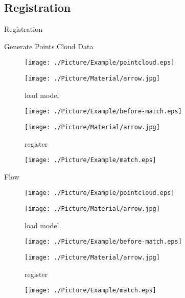\documentclass[xcolor=table,compress,blue]{beamer}
\begin{document}
\subsection{Registration}
\begin{frame}{Registration}
	\begin{exampleblock}{Generate Points Cloud Data}
		\begin{figure}[htpb]
			\centering
			\begin{minipage}[b]{0.8in}
				\centerline{ \texttt{[image: ./Picture/Example/pointcloud.eps]} }
			\end{minipage}
			\begin{minipage}[b]{0.8in}
				\centerline{ \quad}
				\centerline{ \texttt{[image: ./Picture/Material/arrow.jpg]} }
				\centerline{\tiny{load model}}
			\end{minipage}
			\begin{minipage}[b]{0.8in}
				\centerline{ \texttt{[image: ./Picture/Example/before-match.eps]} }
			\end{minipage}
			\begin{minipage}[b]{0.8in}
				\centerline{ \texttt{[image: ./Picture/Material/arrow.jpg]} }
				\centerline{\tiny{register}}
			\end{minipage}
			\begin{minipage}[b]{0.8in}
				\centerline{ \texttt{[image: ./Picture/Example/match.eps]} }
			\end{minipage}
		\end{figure}
	\end{exampleblock}
	\begin{exampleblock}{Flow}
		\begin{figure}[htpb]
			\centering
			\begin{minipage}[b]{0.8in}
				\centerline{ \texttt{[image: ./Picture/Example/pointcloud.eps]} }
			\end{minipage}
			\begin{minipage}[b]{0.8in}
				\centerline{ \quad}
				\centerline{ \texttt{[image: ./Picture/Material/arrow.jpg]} }
				\centerline{\tiny{load model}}
			\end{minipage}
			\begin{minipage}[b]{0.8in}
				\centerline{ \texttt{[image: ./Picture/Example/before-match.eps]} }
			\end{minipage}
			\begin{minipage}[b]{0.8in}
				\centerline{ \texttt{[image: ./Picture/Material/arrow.jpg]} }
				\centerline{\tiny{register}}
			\end{minipage}
			\begin{minipage}[b]{0.8in}
				\centerline{ \texttt{[image: ./Picture/Example/match.eps]} }
			\end{minipage}
		\end{figure}
	\end{exampleblock}
\end{frame}
\end{document}
